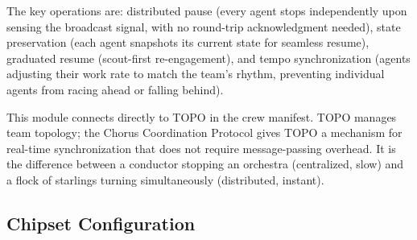 \documentclass[11pt,letterpaper]{article}
\begin{document}
The key operations are: distributed pause (every agent stops independently upon sensing the broadcast signal, with no round-trip acknowledgment needed), state preservation (each agent snapshots its current state for seamless resume), graduated resume (scout-first re-engagement), and tempo synchronization (agents adjusting their work rate to match the team's rhythm, preventing individual agents from racing ahead or falling behind).

This module connects directly to TOPO in the crew manifest. TOPO manages team topology; the Chorus Coordination Protocol gives TOPO a mechanism for real-time synchronization that does not require message-passing overhead. It is the difference between a conductor stopping an orchestra (centralized, slow) and a flock of starlings turning simultaneously (distributed, instant).

\subsection{Chipset Configuration}
\end{document}
